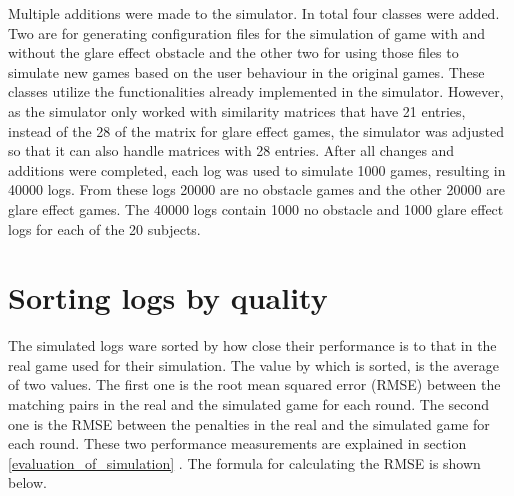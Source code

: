 Multiple additions were made to the simulator. In total four classes were added. Two are for generating configuration files for the simulation of game with and without the glare effect obstacle %
and the other two for using those files to simulate new games based on the user behaviour in the original games.  %
These classes utilize the functionalities already implemented in the simulator. However, as the simulator only worked with similarity matrices that have 21 entries, instead of the 28 of the matrix for glare effect games, the simulator was adjusted so that it can also handle matrices with 28 entries. After all changes and additions were completed, each log was used to simulate 1000 games, resulting in 40000 logs. From these logs 20000 are no obstacle games and the other 20000 are glare effect games. The 40000 logs contain 1000 no obstacle and 1000 glare effect logs for each of the 20 subjects.  



\section{Sorting logs by quality}
\label{sorting_logs_by_quality}
The simulated logs ware sorted by how close their performance is to that in the real game used for their simulation. The value by which is sorted, is the average of two values. The first one is the root mean squared error (RMSE) between the matching pairs in the real and the simulated game for each round. The second one is the RMSE between the penalties in the real and the simulated game for each round. These two performance measurements are explained in section \ref{evaluation_of_simulation} . The formula for calculating the RMSE is shown below. 

